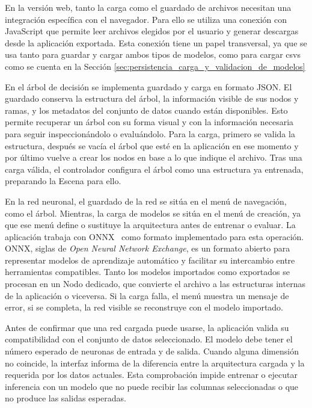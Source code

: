 En la versión web, tanto la carga como el guardado de archivos necesitan una integración específica con el navegador.
Para ello se utiliza una conexión con JavaScript que permite leer archivos elegidos por el usuario y generar descargas desde la aplicación exportada.
Esta conexión tiene un papel transversal, ya que se usa tanto para guardar y cargar ambos tipos de modelos, como para cargar csvs como se cuenta en la Sección \ref{sec:persistencia_carga_y_validacion_de_modelos}

En el árbol de decisión se implementa guardado y carga en formato JSON.
El guardado conserva la estructura del árbol, la información visible de sus \gls{nodo}s y ramas, y los metadatos del conjunto de datos cuando están disponibles.
Esto permite recuperar un árbol con su forma visual y con la información necesaria para seguir inspeccionándolo o evaluándolo.
Para la carga, primero se valida la estructura, después se vacía el árbol que esté en la aplicación en ese momento y por último vuelve a crear los \gls{nodo}s en base a lo que indique el archivo.
Tras una carga válida, el controlador configura el árbol como una estructura ya entrenada, preparando la \gls{Escena} para ello.

En la red neuronal, el guardado de la red se sitúa en el menú de navegación, como el árbol.
Mientras, la carga de modelos se sitúa en el menú de creación, ya que ese menú define o sustituye la arquitectura antes de entrenar o evaluar.
La aplicación trabaja con ONNX~\cite{ONNX} como formato implementado para esta operación.
ONNX, siglas de \textit{Open Neural Network Exchange}, es un formato abierto para representar modelos de aprendizaje automático y facilitar su intercambio entre herramientas compatibles.
Tanto los modelos importados como exportados se procesan en un \gls{Nodo} dedicado, que convierte el archivo a las estructuras internas de la aplicación o viceversa.
Si la carga falla, el menú muestra un mensaje de error, si se completa, la red visible se reconstruye con el modelo importado.

Antes de confirmar que una red cargada puede usarse, la aplicación valida su compatibilidad con el conjunto de datos seleccionado.
El modelo debe tener el número esperado de neuronas de entrada y de salida.
Cuando alguna dimensión no coincide, la interfaz informa de la diferencia entre la arquitectura cargada y la requerida por los datos actuales.
Esta comprobación impide entrenar o ejecutar inferencia con un modelo que no puede recibir las columnas seleccionadas o que no produce las salidas esperadas.

